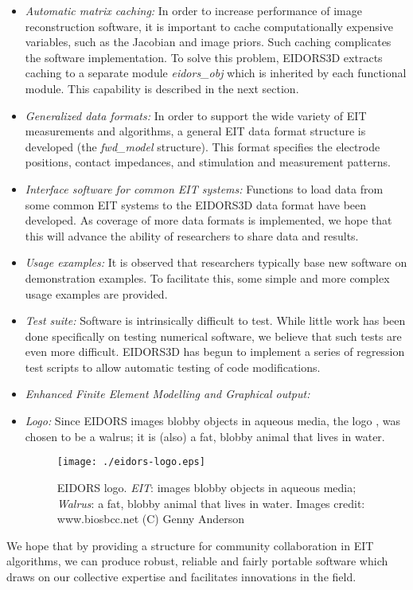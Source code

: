 \documentclass[12pt]{iopart}
\begin{document}
\begin{itemize}
  \item {\em Automatic matrix caching:}
In order to increase
performance of image reconstruction software, it is important to cache
computationally expensive variables, such as the Jacobian and image priors.
Such caching
complicates the software implementation. To solve this problem,
EIDORS3D extracts caching to a separate module {\em eidors\_obj}
which is inherited by
each functional module. This capability is described in the next section.

  \item {\em Generalized data formats:}
In order to support the wide
variety of EIT measurements and algorithms, a general EIT data format
structure is developed (the {\em fwd\_model} structure).
This format specifies the electrode positions, contact impedances,
and stimulation and measurement patterns.

  \item {\em Interface software for common EIT systems:}
Functions
to load data from some common EIT systems to the EIDORS3D data
format have been developed.
As coverage of more data formats is implemented, 
we hope that this will advance the ability of researchers
to share data and results.

  \item {\em Usage examples:}
It is observed that researchers typically base new software on
demonstration examples. To facilitate this, some simple and more
complex usage examples are provided.

  \item {\em Test suite:}
Software is intrinsically difficult to test. While little work
has been done specifically on testing numerical software, we
believe that such tests are even more difficult.
EIDORS3D has begun to implement a series of regression test
scripts to allow automatic testing of code modifications.

  \item {\em Enhanced Finite Element Modelling and Graphical output:}

  \item {\em Logo:}
Since EIDORS images blobby objects in aqueous media,
the logo \label{fig:logo}, was chosen to be a walrus; it is (also)
a fat, blobby animal that lives in water.

%
%
\begin{figure}[th]
\begin{flushright}
\texttt{[image: ./eidors-logo.eps]}
\caption{\small EIDORS logo.
{\em EIT}: images blobby objects in aqueous media;
{\em Walrus}: a fat, blobby animal that lives in water.
 Images credit: www.biosbcc.net (C) Genny Anderson
 }
\end{flushright}
\end{figure}

\end{itemize}
We hope that by providing a structure for community collaboration
in EIT algorithms, we can produce robust,
reliable and fairly portable software which draws on our collective
expertise and facilitates innovations in the field.
\end{document}
